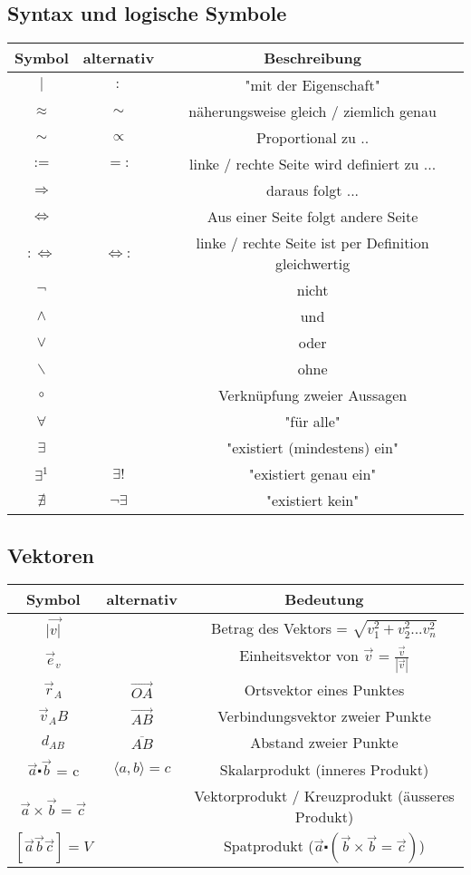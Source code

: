 \documentclass[11pt,a4paper,onecolumn]{scrartcl}
\begin{document}
\begin{flushleft}
\subsection{Syntax und logische Symbole}

\begin{tabular}{|c|c|c|}
\hline
Symbol & alternativ & Beschreibung \\
\hline
$ | $ & $:$ & "mit der Eigenschaft"\\
$\approx $ & $ \sim $ & näherungsweise gleich / ziemlich genau\\
$ \sim $ & $ \propto $ & Proportional zu .. \\
$:= $ & $=:$ & linke / rechte Seite wird definiert zu ...\\
$\Rightarrow$& & daraus folgt ...\\
$\Leftrightarrow$& & Aus einer Seite folgt andere Seite \\
$:\Leftrightarrow$& $\Leftrightarrow:$ & linke / rechte Seite ist per Definition gleichwertig \\
\hline
$ \neg $ & & nicht \\
$ \wedge $ & & und \\
$ \vee $ & & oder \\
$ \backslash $ & & ohne \\
$ \circ $ & & Verknüpfung zweier Aussagen \\
\hline 
$ \forall $ & & "für alle" \\
$ \exists $ & & "existiert (mindestens) ein" \\
$ \exists^{1} $ & $\exists!$ & "existiert genau ein" \\
$ \nexists $ &$\neg\exists$ & "existiert kein" \\
\hline
\end{tabular} 

\subsection{Vektoren}
\begin{tabular}{|c|c|c|}
\hline
Symbol & alternativ & Bedeutung \\
\hline
$|\vec{v|}$ & & Betrag des Vektors = $ \sqrt{v^{2}_{1}+v^{2}_{2} ...v^{2}_{n}}$ \\
$ \vec{e}_{v} $ & & Einheitsvektor von $\vec{v}$ = $ \frac{\vec{v}}{|\vec{v}|}$\\
$\vec{r}_{A}$ & $\vec{OA}$ & Ortsvektor eines Punktes\\
$ \vec{v}_{A}B$ & $\vec{AB}$ & Verbindungsvektor zweier Punkte \\
$ d_{AB} $ & $ \overline{AB} $ & Abstand zweier Punkte \\
\hline
$\vec{a}\centerdot\vec{b} $ = c & $\langle a,b \rangle = c $ & Skalarprodukt (inneres Produkt)\\
$\vec{a}\times\vec{b} = \vec{c}$ & & Vektorprodukt / Kreuzprodukt (äusseres Produkt)\\
$[\vec{a}\vec{b}\vec{c}] = V$ & & Spatprodukt ($\vec{a}\centerdot(\vec{b}\times\vec{b} = \vec{c})$)\\
\hline
\end{tabular}


\end{flushleft}
\end{document}
